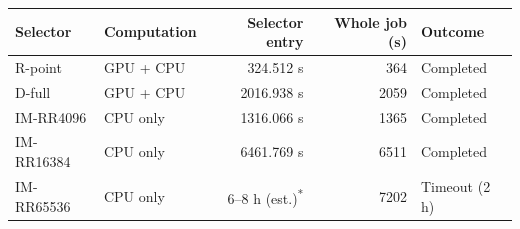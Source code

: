 \begin{tabular}{llrrl}
\toprule
Selector & Computation & Selector entry & Whole job (s) & Outcome \\
\midrule
R-point & GPU + CPU & 324.512 s & 364 & Completed \\
D-full & GPU + CPU & 2016.938 s & 2059 & Completed \\
IM-RR4096 & CPU only & 1316.066 s & 1365 & Completed \\
IM-RR16384 & CPU only & 6461.769 s & 6511 & Completed \\
IM-RR65536 & CPU only & 6--8 h (est.)\textsuperscript{*} & 7202 & Timeout (2 h) \\
\bottomrule
\end{tabular}
